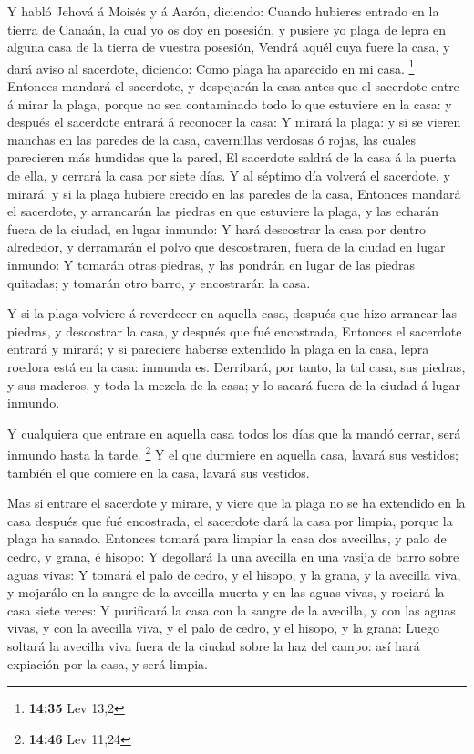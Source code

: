  Y habló Jehová á Moisés y á Aarón, diciendo: 
Cuando hubieres entrado en la tierra de Canaán, la cual yo os doy en
posesión, y pusiere yo plaga de lepra en alguna casa de la tierra de
vuestra posesión,  Vendrá aquél cuya fuere la casa, y dará
aviso al sacerdote, diciendo: Como plaga ha aparecido en mi casa.
\footnote{\textbf{14:35} Lev 13,2}  Entonces mandará el
sacerdote, y despejarán la casa antes que el sacerdote entre á mirar la
plaga, porque no sea contaminado todo lo que estuviere en la casa: y
después el sacerdote entrará á reconocer la casa:  Y mirará
la plaga: y si se vieren manchas en las paredes de la casa, cavernillas
verdosas ó rojas, las cuales parecieren más hundidas que la pared,
 El sacerdote saldrá de la casa á la puerta de ella, y
cerrará la casa por siete días.  Y al séptimo día volverá
el sacerdote, y mirará: y si la plaga hubiere crecido en las paredes de
la casa,  Entonces mandará el sacerdote, y arrancarán las
piedras en que estuviere la plaga, y las echarán fuera de la ciudad, en
lugar inmundo:  Y hará descostrar la casa por dentro
alrededor, y derramarán el polvo que descostraren, fuera de la ciudad en
lugar inmundo:  Y tomarán otras piedras, y las pondrán en
lugar de las piedras quitadas; y tomarán otro barro, y encostrarán la
casa.

 Y si la plaga volviere á reverdecer en aquella casa,
después que hizo arrancar las piedras, y descostrar la casa, y después
que fué encostrada,  Entonces el sacerdote entrará y
mirará; y si pareciere haberse extendido la plaga en la casa, lepra
roedora está en la casa: inmunda es.  Derribará, por tanto,
la tal casa, sus piedras, y sus maderos, y toda la mezcla de la casa; y
lo sacará fuera de la ciudad á lugar inmundo.

 Y cualquiera que entrare en aquella casa todos los días
que la mandó cerrar, será inmundo hasta la tarde. \footnote{\textbf{14:46}
  Lev 11,24}  Y el que durmiere en aquella casa, lavará sus
vestidos; también el que comiere en la casa, lavará sus vestidos.

 Mas si entrare el sacerdote y mirare, y viere que la plaga
no se ha extendido en la casa después que fué encostrada, el sacerdote
dará la casa por limpia, porque la plaga ha sanado. 
Entonces tomará para limpiar la casa dos avecillas, y palo de cedro, y
grana, é hisopo:  Y degollará la una avecilla en una vasija
de barro sobre aguas vivas:  Y tomará el palo de cedro, y
el hisopo, y la grana, y la avecilla viva, y mojarálo en la sangre de la
avecilla muerta y en las aguas vivas, y rociará la casa siete veces:
 Y purificará la casa con la sangre de la avecilla, y con
las aguas vivas, y con la avecilla viva, y el palo de cedro, y el
hisopo, y la grana:  Luego soltará la avecilla viva fuera
de la ciudad sobre la haz del campo: así hará expiación por la casa, y
será limpia.

